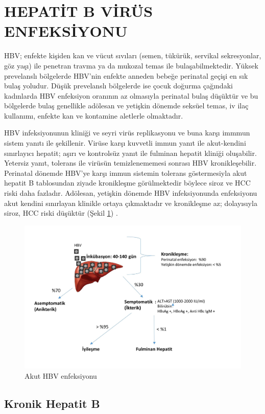 \section{HEPATİT B VİRÜS ENFEKSİYONU}

HBV; enfekte kişiden kan ve vücut sıvıları (semen, tükürük, servikal sekresyonlar, göz yaşı) ile penetran travma ya da mukozal temas ile bulaşabilmektedir. Yüksek prevelanslı bölgelerde HBV’nin enfekte anneden bebeğe perinatal geçişi en sık bulaş yoludur. Düşük prevelanslı bölgelerde ise çocuk doğurma çağındaki kadınlarda HBV enfeksiyon oranının az olmasıyla perinatal bulaş düşüktür ve bu bölgelerde bulaş genellikle adölesan ve yetişkin dönemde seksüel temas, iv ilaç kullanımı, enfekte kan ve kontamine aletlerle olmaktadır. 


HBV infeksiyonunun kliniği ve seyri virüs replikasyonu ve buna karşı immmun sistem yanıtı ile şekillenir. Virüse karşı kuvvetli immun yanıt ile akut-kendini sınırlayıcı hepatit; aşırı ve kontrolsüz yanıt ile fulminan hepatit kliniği oluşabilir. Yetersiz yanıt, tolerans ile virüsün temizlenememesi sonrası HBV kronikleşebilir. Perinatal dönemde HBV’ye karşı immun sistemin tolerans göstermesiyla akut hepatit B tablosundan ziyade kronikleşme görülmektedir böylece siroz ve HCC riski daha fazladır. Adölesan, yetişkin dönemde HBV infeksiyonunda enfeksiyonu akut kendini sınırlayan klinikle ortaya çıkmaktadır ve kronikleşme az; dolayısıyla siroz, HCC riski düşüktür (Şekil \ref{fig:akuthbv}) . 


\begin{figure}[tbph]
\centering
\includegraphics[width=0.8\linewidth]{../Figures/akuthbv}
\caption[Akut HBV enfeksiyonu]{Akut HBV enfeksiyonu \cite{terrault2016aasld}}
\label{fig:akuthbv}
\end{figure}



\subsection{Kronik Hepatit B}

